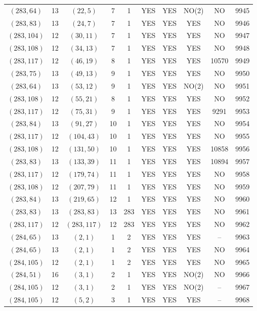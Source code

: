 \begin{longtable}{|c|c|c|c|c|c|c|c|c|c|}
$(283, 64)$ & 13 & $(22, 5)$ & 7 & 1 & YES & YES & NO(2) & NO & 9945\\
$(283, 83)$ & 13 & $(24, 7)$ & 7 & 1 & YES & YES & YES & NO & 9946\\
$(283, 104)$ & 12 & $(30, 11)$ & 7 & 1 & YES & YES & YES & NO & 9947\\
$(283, 108)$ & 12 & $(34, 13)$ & 7 & 1 & YES & YES & YES & NO & 9948\\
$(283, 117)$ & 12 & $(46, 19)$ & 8 & 1 & YES & YES & YES & 10570 & 9949\\
$(283, 75)$ & 13 & $(49, 13)$ & 9 & 1 & YES & YES & YES & NO & 9950\\
$(283, 64)$ & 13 & $(53, 12)$ & 9 & 1 & YES & YES & NO(2) & NO & 9951\\
$(283, 108)$ & 12 & $(55, 21)$ & 8 & 1 & YES & YES & YES & NO & 9952\\
$(283, 117)$ & 12 & $(75, 31)$ & 9 & 1 & YES & YES & YES & 9291 & 9953\\
$(283, 84)$ & 13 & $(91, 27)$ & 10 & 1 & YES & YES & YES & NO & 9954\\
$(283, 117)$ & 12 & $(104, 43)$ & 10 & 1 & YES & YES & YES & NO & 9955\\
$(283, 108)$ & 12 & $(131, 50)$ & 10 & 1 & YES & YES & YES & 10858 & 9956\\
$(283, 83)$ & 13 & $(133, 39)$ & 11 & 1 & YES & YES & YES & 10894 & 9957\\
$(283, 117)$ & 12 & $(179, 74)$ & 11 & 1 & YES & YES & YES & NO & 9958\\
$(283, 108)$ & 12 & $(207, 79)$ & 11 & 1 & YES & YES & YES & NO & 9959\\
$(283, 84)$ & 13 & $(219, 65)$ & 12 & 1 & YES & YES & YES & NO & 9960\\
$(283, 83)$ & 13 & $(283, 83)$ & 13 & 283 & YES & YES & YES & NO & 9961\\
$(283, 117)$ & 12 & $(283, 117)$ & 12 & 283 & YES & YES & YES & NO & 9962\\
$(284, 65)$ & 13 & $(2, 1)$ & 1 & 2 & YES & YES & YES & -- & 9963\\
$(284, 65)$ & 13 & $(2, 1)$ & 1 & 2 & YES & YES & YES & NO & 9964\\
$(284, 105)$ & 12 & $(2, 1)$ & 1 & 2 & YES & YES & YES & NO & 9965\\
$(284, 51)$ & 16 & $(3, 1)$ & 2 & 1 & YES & YES & NO(2) & NO & 9966\\
$(284, 105)$ & 12 & $(3, 1)$ & 2 & 1 & YES & YES & NO(2) & -- & 9967\\
$(284, 105)$ & 12 & $(5, 2)$ & 3 & 1 & YES & YES & YES & -- & 9968\\

\end{longtable}
